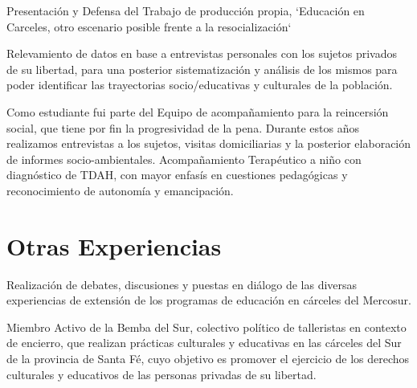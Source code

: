 \documentclass[11pt,a4paper,sans]{moderncv}        %
\begin{document}
  {
    Presentación y Defensa del Trabajo de producción propia, `Educación en Carceles, otro escenario posible frente a la resocialización`
  }
\vspace{3mm}

  {
    Relevamiento de datos en base a entrevistas personales con los sujetos privados de su libertad, para una posterior sistematización y análisis de los mismos para poder identificar las trayectorias socio/educativas y culturales de la población.
  }
\vspace{3mm}

  {
    Como estudiante fui parte del Equipo de acompañamiento para la reincersión social, que tiene por fin la progresividad de la pena. Durante estos años realizamos entrevistas a los sujetos, visitas domiciliarias y la posterior elaboración de informes socio-ambientales.
  }
\vspace{3mm}
  {
    Acompañamiento Terap\'eutico a niño con diagnóstico de TDAH, con mayor enfasís en cuestiones pedagógicas y reconocimiento de autonomía y emancipación.
  }
\vspace{2mm}

\section{Otras Experiencias}
  {
    Realización de debates, discusiones y puestas en diálogo de las diversas experiencias de extensión de los programas de educación en cárceles del Mercosur.
  }

\vspace{2mm}

  {
    Miembro Activo de la Bemba del Sur, colectivo político de talleristas en contexto de encierro, que realizan prácticas culturales y educativas en las cárceles del Sur de la provincia de Santa Fé, cuyo objetivo es promover el ejercicio de los derechos culturales y educativos de las personas privadas de su libertad.
  }
\end{document}
